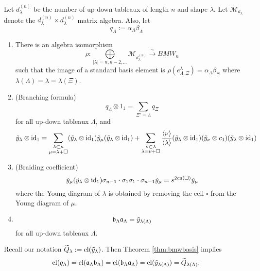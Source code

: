 \begin{theorem} \label{thm:bmwbasis}
Let $d_\lambda^{(n)}$ be the number of up-down tableaux of length $n$ and shape $\lambda$. 
Let $\mathcal{M}_{d_\lambda}$ denote the $d_\lambda^{(n)} \times d_\lambda^{(n)}$ matrix algebra. 
Also, let
\[
    q_\Lambda := \alpha_\Lambda \beta_\Lambda
\]

\begin{enumerate} 
\item There is an algebra isomorphism
\[
    \rho: \underset{|\lambda| = n, n-2, \dots}{\bigoplus} \mathcal{M}_{d_{\lambda}^{(n)}} \overset{\sim}{\longrightarrow} BMW_n
\]
such that the image of a standard basis element is $\rho( e_{\Lambda,\Xi}^\lambda) = \alpha_\Lambda \beta_\Xi$ where $\lambda(\Lambda) = \lambda = \lambda(\Xi)$. \\
\item (Branching formula)
\[
    q_\Lambda \otimes 1_1 = \sum_{\Xi'=\Lambda} q_\Xi
\] 
for all up-down tableaux $\Lambda$, and
\[
\tilde{y}_\lambda \otimes {\rm{id}}_1 = \sum_{\substack{\lambda \subset \mu \\ \mu = \lambda + \square}} (\tilde{y}_\lambda \otimes {\rm{id}}_1) \tilde{y}_\mu (\tilde{y}_\lambda \otimes {\rm{id}}_1) + \sum_{\substack{\nu \subset \lambda \\ \lambda = \nu + \square}} \frac{\langle \nu \rangle}{\langle \lambda \rangle} (\tilde{y}_\lambda \otimes {\rm{id}}_1) (\tilde{y}_\nu \otimes c_1) (\tilde{y}_\lambda \otimes {\rm{id}}_1) 
\]
\item (Braiding coefficient)
\[
\tilde{y}_\mu (\tilde{y}_\lambda \otimes {\rm{id}}_1) \sigma_{n-1} \cdot \sigma_1 \sigma_1 \cdot \sigma_{n-1} \tilde{y}_\mu = s^{2\mathrm{cn}(\square)}\tilde{y}_\mu
\]
where the Young diagram of $\lambda$ is obtained by removing the cell $\square$ from the Young diagram of $\mu$.  
\item 
\[
    \mathfrak{b}_\Lambda \mathfrak{a}_\Lambda = \tilde{y}_{\lambda(\Lambda)}
\]
for all up-down tableaux $\Lambda$.
\end{enumerate}
\end{theorem}

\begin{remark} \label{rmk:qclosure}
Recall our notation $\widetilde{Q}_\lambda := \mathrm{cl}(\tilde{y}_\lambda)$. Then Theorem \ref{thm:bmwbasis} implies
\[
    \mathrm{cl}(q_\Lambda) = \mathrm{cl}(\mathfrak{a}_\Lambda \mathfrak{b}_\Lambda) = \mathrm{cl}(\mathfrak{b}_\Lambda \mathfrak{a}_\Lambda) = \mathrm{cl}(\tilde{y}_{\lambda(\Lambda)}) = \widetilde{Q}_{\lambda(\Lambda)}.
\]
\end{remark}

